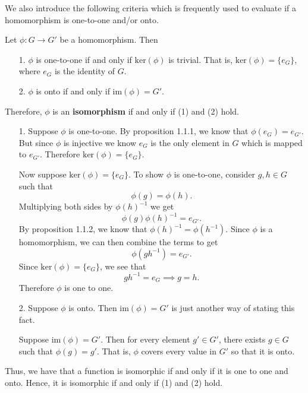     We also introduce the following criteria which is frequently used
    to evaluate if a homomorphism is one-to-one and/or onto. 
    
    \begin{thm}\label{theorem_isomorph}
        Let $\phi: G \to G'$ be a homomorphism.
        Then 
        \begin{itemize}
            \item[1.] $\phi$ is one-to-one if and only if
            $\mbox{ker}(\phi)$ is trivial. That is, $\mbox{ker}(\phi) = \{e_G\}$, where $e_G$ is
            the identity of $G$.

            \item[2.] $\phi$ is onto if and only if $\mbox{im}(\phi) = G'$. 
        \end{itemize}
        Therefore, $\phi$ is an \textbf{isomorphism} if and only if
        (1) and (2) hold.
    \end{thm}

    \begin{prf}
        \begin{itemize}
            \item[1.] Suppose $\phi$ is one-to-one. By proposition
            1.1.1, we know that $\phi(e_G) = e_{G'}$. But since $\phi$
            is injective we know $e_G$ is the only element in $G$
            which is mapped to $e_{G'}$. Therefore $\mbox{ker}(\phi) =
            \{e_G\}$.

            Now suppose $\mbox{ker}(\phi) = \{e_G\}$. To show $\phi$
            is one-to-one, consider
            $g, h \in G$ such that
            \[
                \phi(g) = \phi(h).
            \]
            Multiplying both sides by $\phi(h)^{-1}$ we get 
            \[
                \phi(g)\phi(h)^{-1} = e_{G'}.
            \]
            By proposition 1.1.2, we know that $\phi(h)^{-1} =
            \phi(h^{-1})$. Since $\phi$ is a homomorphism, we can then
           combine the terms to get 
           \[
                \phi(gh^{-1}) = e_{G'}.
           \] 
           Since $\mbox{ker}(\phi) = \{e_G\}$, we see that 
           \[
                gh^{-1} = e_G \implies g = h.                
           \]
           Therefore $\phi$ is one to one.
           
           \item[2.] Suppose $\phi$ is onto. Then $\mbox{im}(\phi) = G'$
           is just another way of stating this fact. 
           
           Suppose $\mbox{im}(\phi) = G'$. Then for every element $g'
           \in G'$, there exists $g \in G$ such that $\phi(g) = g'$.
           That is, $\phi$ covers every value in $G'$ so that it is
           onto.
        \end{itemize}
        Thus, we have that a function is isomorphic if and only if it
        is one to one and onto. Hence, it is isomorphic if and only if
        (1) and (2) hold.
    \end{prf}

